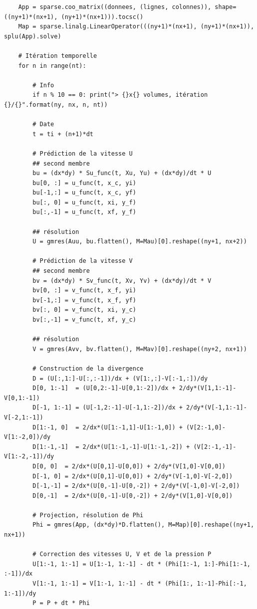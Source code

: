 \begin{verbatim}
    App = sparse.coo_matrix((donnees, (lignes, colonnes)), shape=((ny+1)*(nx+1), (ny+1)*(nx+1))).tocsc()
    Map = sparse.linalg.LinearOperator(((ny+1)*(nx+1), (ny+1)*(nx+1)), splu(App).solve)
    
    # Itération temporelle
    for n in range(nt):
        
        # Info
        if n % 10 == 0: print("> {}x{} volumes, itération {}/{}".format(ny, nx, n, nt))
        
        # Date
        t = ti + (n+1)*dt
        
        # Prédiction de la vitesse U
        ## second membre
        bu = (dx*dy) * Su_func(t, Xu, Yu) + (dx*dy)/dt * U
        bu[0, :] = u_func(t, x_c, yi)
        bu[-1,:] = u_func(t, x_c, yf)
        bu[:, 0] = u_func(t, xi, y_f)
        bu[:,-1] = u_func(t, xf, y_f)
        
        ## résolution
        U = gmres(Auu, bu.flatten(), M=Mau)[0].reshape((ny+1, nx+2))
        
        # Prédiction de la vitesse V
        ## second membre
        bv = (dx*dy) * Sv_func(t, Xv, Yv) + (dx*dy)/dt * V
        bv[0, :] = v_func(t, x_f, yi)
        bv[-1,:] = v_func(t, x_f, yf)
        bv[:, 0] = v_func(t, xi, y_c)
        bv[:,-1] = v_func(t, xf, y_c)
        
        ## résolution
        V = gmres(Avv, bv.flatten(), M=Mav)[0].reshape((ny+2, nx+1))
        
        # Construction de la divergence
        D = (U[:,1:]-U[:,:-1])/dx + (V[1:,:]-V[:-1,:])/dy
        D[0, 1:-1]  = (U[0,2:-1]-U[0,1:-2])/dx + 2/dy*(V[1,1:-1]-V[0,1:-1])
        D[-1, 1:-1] = (U[-1,2:-1]-U[-1,1:-2])/dx + 2/dy*(V[-1,1:-1]-V[-2,1:-1])
        D[1:-1, 0]  = 2/dx*(U[1:-1,1]-U[1:-1,0]) + (V[2:-1,0]-V[1:-2,0])/dy
        D[1:-1,-1]  = 2/dx*(U[1:-1,-1]-U[1:-1,-2]) + (V[2:-1,-1]-V[1:-2,-1])/dy
        D[0, 0]  = 2/dx*(U[0,1]-U[0,0]) + 2/dy*(V[1,0]-V[0,0])
        D[-1, 0] = 2/dx*(U[0,1]-U[0,0]) + 2/dy*(V[-1,0]-V[-2,0])
        D[-1,-1] = 2/dx*(U[0,-1]-U[0,-2]) + 2/dy*(V[-1,0]-V[-2,0])
        D[0,-1]  = 2/dx*(U[0,-1]-U[0,-2]) + 2/dy*(V[1,0]-V[0,0])
        
        # Projection, résolution de Phi
        Phi = gmres(App, (dx*dy)*D.flatten(), M=Map)[0].reshape((ny+1, nx+1))
        
        # Correction des vitesses U, V et de la pression P
        U[1:-1, 1:-1] = U[1:-1, 1:-1] - dt * (Phi[1:-1, 1:]-Phi[1:-1, :-1])/dx
        V[1:-1, 1:-1] = V[1:-1, 1:-1] - dt * (Phi[1:, 1:-1]-Phi[:-1, 1:-1])/dy
        P = P + dt * Phi
    

\end{verbatim}

